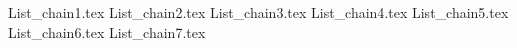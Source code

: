 List_chain1.tex                 
List_chain2.tex                 
List_chain3.tex                 
List_chain4.tex                 
List_chain5.tex                 
List_chain6.tex                 
List_chain7.tex                 
